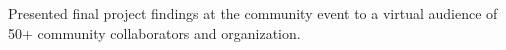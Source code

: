 \begin{cventries}
{\begin{cvitems}
        \item Presented final project findings at the community event to a virtual audience of 50+ community collaborators and organization.
      \end{cvitems}
    }

\end{cventries}
